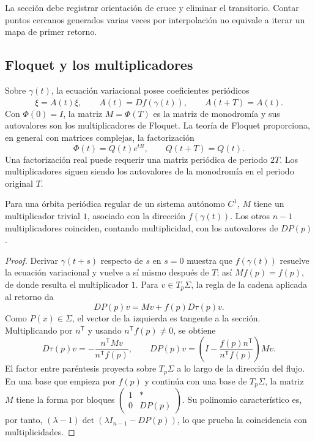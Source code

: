 La sección debe registrar orientación de cruce y eliminar el transitorio.
Contar puntos cercanos generados varias veces por interpolación no equivale a
iterar un mapa de primer retorno.

\subsection{Floquet y los multiplicadores}

Sobre \(\gamma(t)\), la ecuación variacional posee coeficientes periódicos
\begin{equation}
 \dot\xi=A(t)\xi,\qquad A(t)=Df(\gamma(t)),\qquad A(t+T)=A(t).
 \label{geo:eq:periodic-variational}
\end{equation}
Con \(\Phi(0)=I\), la matriz \(M=\Phi(T)\) es la matriz de monodromía y sus autovalores son los
multiplicadores de Floquet. La teoría de Floquet proporciona, en general con
matrices complejas, la factorización
\begin{equation}
 \Phi(t)=Q(t)e^{tR},\qquad Q(t+T)=Q(t).
 \label{geo:eq:floquet-factorization}
\end{equation}
Una factorización real puede requerir una matriz periódica de periodo
\(2T\). Los multiplicadores siguen siendo los autovalores de la monodromía
en el periodo original \(T\).

\begin{proposition}
Para una órbita periódica regular de un sistema autónomo \(C^1\), \(M\) tiene
un multiplicador trivial \(1\), asociado con la dirección \(f(\gamma(t))\).
Los otros \(n-1\) multiplicadores coinciden, contando multiplicidad, con los
autovalores de \(DP(p)\).
\end{proposition}

\begin{proof}
Derivar \(\gamma(t+s)\) respecto de \(s\) en \(s=0\) muestra que
\(f(\gamma(t))\) resuelve la ecuación variacional y vuelve a sí mismo después
de \(T\); así \(Mf(p)=f(p)\), de donde resulta el multiplicador \(1\).
Para \(v\in T_p\Sigma\), la regla de la cadena aplicada al retorno da
\[
 DP(p)v=Mv+f(p)D\tau(p)v.
\]
Como \(P(x)\in\Sigma\), el vector de la izquierda es tangente a la
sección. Multiplicando por \(n^{\mathsf T}\) y usando
\(n^{\mathsf T}f(p)\ne0\), se obtiene
\[
 D\tau(p)v=-\frac{n^{\mathsf T}Mv}{n^{\mathsf T}f(p)},\qquad
 DP(p)v=\left(I-\frac{f(p)n^{\mathsf T}}
 {n^{\mathsf T}f(p)}\right)Mv.
\]
El factor entre paréntesis proyecta sobre \(T_p\Sigma\) a lo largo de la
dirección del flujo. En una base que empieza por \(f(p)\) y continúa con
una base de \(T_p\Sigma\), la matriz \(M\) tiene la forma por bloques
\(\left(\begin{smallmatrix}1&*\\0&DP(p)\end{smallmatrix}\right)\).
Su polinomio característico es, por tanto,
\((\lambda-1)\det(\lambda I_{n-1}-DP(p))\), lo que prueba la
coincidencia con multiplicidades.
\end{proof}

